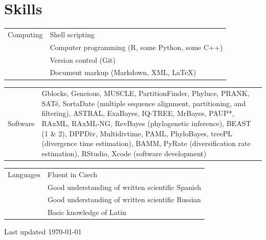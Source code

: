 \documentclass[10pt]{article}
\begin{document}
\section*{Skills}

\begin{tabularx}{\textwidth}{>{\raggedleft\arraybackslash}p{2.2cm} X}
Computing & Shell scripting \\
& Computer programming (\textsf{R}, some \textsf{Python}, some \textsf{C++}) \\
& Version control (\textsf{Git}) \\
& Document markup (Markdown, XML, \LaTeX)
\end{tabularx}
\begin{tabularx}{\textwidth}{>{\raggedleft\arraybackslash}p{2.2cm} X}
Software & \textsf{Gblocks}, \textsf{Geneious}, \textsf{MUSCLE},  \textsf{PartitionFinder}, \textsf{Phyluce}, \textsf{PRANK}, \textsf{SAT\'{e}}, \textsf{SortaDate} (multiple sequence alignment, partitioning, and filtering), \textsf{ASTRAL}, \textsf{ExaBayes}, \textsf{IQ-TREE}, \textsf{MrBayes}, \textsf{PAUP*}, \textsf{RAxML}, \textsf{RAxML-NG}, \textsf{RevBayes} (phylogenetic inference), \textsf{BEAST (1 \& 2)}, \textsf{DPPDiv}, \textsf{Multidivtime}, \textsf{PAML}, \textsf{PhyloBayes}, \textsf{treePL} (divergence time estimation), \textsf{BAMM}, \textsf{PyRate} (diversification rate estimation), \textsf{RStudio}, \textsf{Xcode} (software development)
\end{tabularx}
\begin{tabularx}{\textwidth}{>{\raggedleft\arraybackslash}p{2.2cm} X}
Languages & Fluent in Czech \\
& Good understanding of written scientific Spanish \\
& Good understanding of written scientific Russian \\
& Basic knowledge of Latin
\end{tabularx}

\vspace*{1cm}

\begin{center}
Last updated \today
\end{center}
\end{document}
